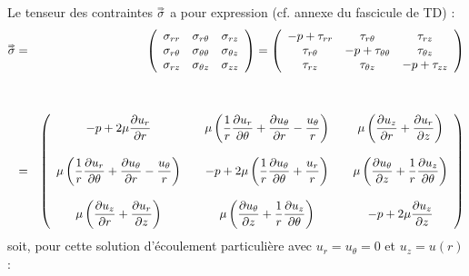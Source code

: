 \documentclass[10pt, a4paper]{article}
\begin{document}
\begin{myenumerate}
\medskip
\item
	Le tenseur des contraintes $\accentset{\Rightarrow}{\sigma}$ 
	a pour expression (cf. annexe du fascicule de TD) :
	\begin{eqnarray*}
		\accentset{\Rightarrow}{\sigma}
		 & = & 
		\left (
		\begin{array}{ccc}
			\sigma_{rr} & \sigma_{r\theta} & \sigma_{rz} \\
			\sigma_{r\theta} & \sigma_{\theta\theta} & \sigma_{\theta z} \\
			\sigma_{rz} & \sigma_{\theta z} & \sigma_{zz}
		\end{array}
		\right )
		=
		\left (
		\begin{array}{ccc}
			- p + \tau_{rr} & \tau_{r\theta} & \tau_{rz} \\
			\tau_{r\theta} & -p + \tau_{\theta\theta} & \tau_{\theta z} \\
			\tau_{rz} & \tau_{\theta z} & -p + \tau_{zz}
		\end{array}
		\right )	
		\\	 & & \\ & & \\
		& = &
		\left (
		\begin{array}{ccccc}
			- p + 2\mu \displaystyle \frac{\partial u_r}{\partial r} 
			& & 
			\mu \left( \displaystyle \frac{1}{r} \displaystyle \frac{\partial u_r}{\partial \theta} + \displaystyle \frac{\partial u_{\theta}}{\partial r} - \displaystyle \frac{u_{\theta}}{r} \right) 
			& & 
			\mu \left ( \displaystyle \frac{\partial u_z}{\partial r} + \displaystyle \frac{\partial u_r}{\partial z} \right ) 
			\\ & & & & \\
			\mu \left( \displaystyle \frac{1}{r} \displaystyle \frac{\partial u_r}{\partial \theta} + \displaystyle \frac{\partial u_{\theta}}{\partial r} - \displaystyle \frac{u_{\theta}}{r} \right) 
			& & 
			-p + 2\mu \left( \displaystyle \frac{1}{r}\displaystyle \frac{\partial u_\theta}{\partial \theta} + \displaystyle \frac{u_r}{r} \right) 
			& & 
			\mu \left( \displaystyle \frac{\partial u_\theta}{\partial z} + \displaystyle \frac{1}{r} \displaystyle \frac{\partial u_z}{\partial \theta} \right) 
			\\ & & & & \\
			\mu \left ( \displaystyle \frac{\partial u_z}{\partial r} + \displaystyle \frac{\partial u_r}{\partial z} \right ) 
			& & 
			\mu \left( \displaystyle \frac{\partial u_\theta}{\partial z} + \displaystyle \frac{1}{r} \displaystyle \frac{\partial u_z}{\partial \theta} \right)
			& & 
			-p + 2\mu \displaystyle \frac{\partial u_z}{\partial z}
		\end{array}
		\right )		
	\end{eqnarray*}
	soit, 
	pour cette solution d'écoulement particulière
	avec $u_r = u_\theta = 0$ et $u_z = u(r)$ :
	
	\medskip
	\dotfill
\end{myenumerate}
\end{document}
